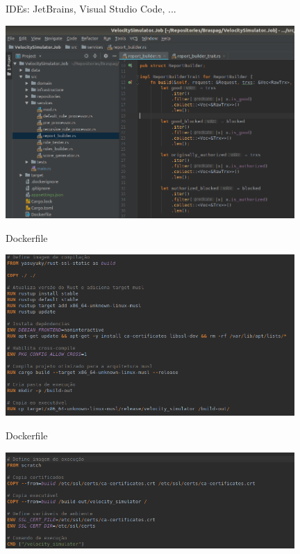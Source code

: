 \documentclass[aspectratio=169]{beamer}
\begin{document}
\begin{frame}{IDEs: JetBrains, Visual Studio Code, ...}
	\begin{center}
		\includegraphics[width=11cm]{imgs/ide.png}	
	\end{center}
\end{frame}

\begin{frame}{Dockerfile}
	\begin{center}
		\includegraphics[width=11cm]{imgs/dockerfile1.png}	
	\end{center}
\end{frame}

\begin{frame}[noframenumbering]{Dockerfile}
	\begin{center}
		\includegraphics[width=11cm]{imgs/dockerfile2.png}	
	\end{center}
\end{frame}
\end{document}
